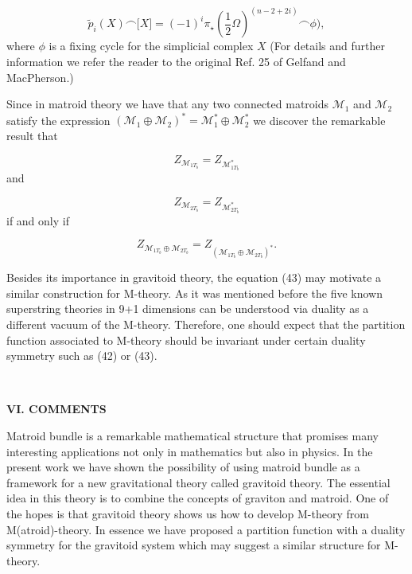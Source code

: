 \documentclass[a4paper,12pt]{article}
\begin{document}
\begin{equation}
\tilde{p}_{i}(X)\smallfrown \lbrack X]=(-1)^{i}\pi _{\star }(\frac{1}{2}%
\Omega )^{(n-2+2i)}\smallfrown \phi ),  \label{46}
\end{equation}
where $\phi $ is a fixing cycle for the simplicial complex $X$ (For details
and further information we refer the reader to the original Ref. 25 of
Gelfand and MacPherson.)

Since in matroid theory we have that any two connected matroids $\mathcal{M}%
_{1}$ and $\mathcal{M}_{2}$ satisfy the expression $(\mathcal{M}_{1}\oplus 
\mathcal{M}_{2})^{\ast }=\mathcal{M}_{1}^{\ast }\oplus \mathcal{M}_{2}^{\ast
}$ we discover the remarkable result that

\begin{equation}
Z_{\mathcal{M}_{1T_{b}}}=Z_{\mathcal{M}_{1T_{b}}^{\ast }}  \label{47}
\end{equation}
and

\begin{equation}
Z_{\mathcal{M}_{2T_{b}}}=Z_{\mathcal{M}_{2T_{b}}^{\ast }}  \label{48}
\end{equation}
if and only if

\begin{equation}
Z_{\mathcal{M}_{1T_{b}}\oplus \mathcal{M}_{2T_{b}}}=Z_{(\mathcal{M}%
_{1T_{b}}\oplus \mathcal{M}_{2T_{b}})^{\ast }}.  \label{49}
\end{equation}

Besides its importance in gravitoid theory, the equation (43) may motivate a
similar construction for M-theory. As it was mentioned before the five known
superstring theories in 9+1 dimensions can be understood via duality as a
different vacuum of the M-theory. Therefore, one should expect that the
partition function associated to M-theory should be invariant under certain
duality symmetry such as (42) or (43).

\bigskip

\smallskip\ 

\noindent \textbf{VI. COMMENTS}

\bigskip

Matroid bundle is a remarkable mathematical structure that promises many
interesting applications not only in mathematics but also in physics. In the
present work we have shown the possibility of using matroid bundle as a
framework for a new gravitational theory called gravitoid theory. The
essential idea in this theory is to combine the concepts of graviton and
matroid. One of the hopes is that gravitoid theory shows us how to develop
M-theory from M(atroid)-theory. In essence we have proposed a partition
function with a duality symmetry for the gravitoid system which may suggest
a similar structure for M-theory.
\end{document}
